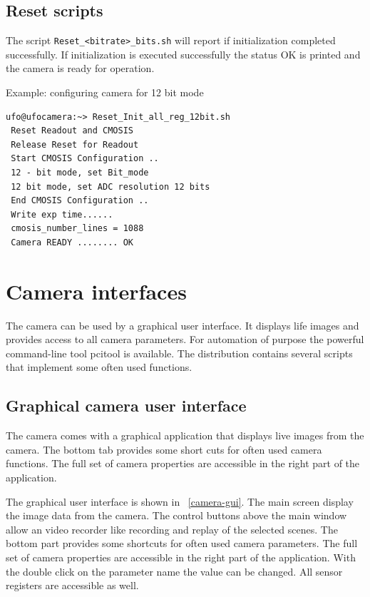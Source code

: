 \newpage
\subsection{Reset scripts}
The script \verb/Reset_<bitrate>_bits.sh/ will report if initialization completed successfully. 
If initialization is executed successfully the status  OK  is printed and the camera is ready for operation.

Example: configuring camera for 12 bit mode  

\begin{lstlisting}
ufo@ufocamera:~> Reset_Init_all_reg_12bit.sh
 Reset Readout and CMOSIS 
 Release Reset for Readout
 Start CMOSIS Configuration ..
 12 - bit mode, set Bit_mode 
 12 bit mode, set ADC resolution 12 bits 
 End CMOSIS Configuration ..
 Write exp time......
 cmosis_number_lines = 1088
 Camera READY ........ OK
\end{lstlisting}


\newpage
\section{Camera interfaces}

The camera can be used by a graphical user interface. It displays life images and provides access to all camera parameters. 
For automation of purpose the powerful command-line tool pcitool is available. The distribution contains several scripts that 
implement some often used functions.

\subsection{Graphical camera user interface}

The camera comes with a graphical application that displays live images from the camera. 
The bottom tab provides some short cuts for often used camera functions. 
The full set of camera properties are accessible in the right part of the application. 

The graphical user interface is shown in \figurename~\ref{camera-gui}. The main screen display the image data from the camera. The control buttons above the main window allow an video recorder like recording and replay of the selected scenes.
The bottom part provides some shortcuts for often used camera parameters.  The full set of camera properties are accessible in the right part of the application. With the double click on the parameter name the value can be changed. All sensor registers are accessible as well. 

